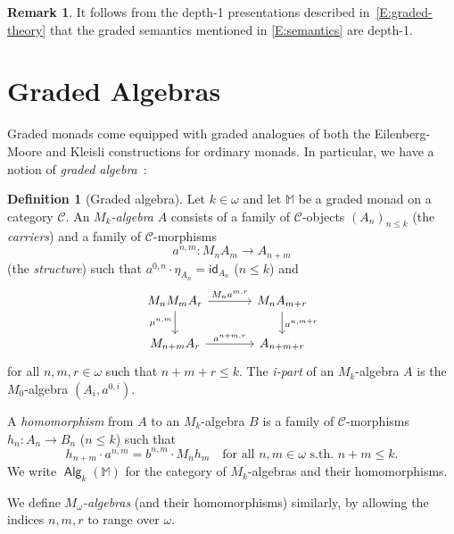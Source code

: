 \documentclass[sigconf,
			final%
			nonacm
                        ]{acmart}
\numberwithin{equation}{section}
\numberwithin{equation}{section}
\theoremstyle{plain}
\theoremstyle{definition}
\newtheorem{defn}[thm]{Definition}
\newtheorem{rem}[thm]{Remark}
\newcommand{\id}{\mathsf{id}}
\newcommand{\M}{\mathbb{M}}                   %
\newcommand{\CatC}{\mathscr{C}}           %
\DeclareMathOperator{\Alg}{\mathsf{Alg}}
\begin{document}
\begin{rem}
  It follows from the depth-1 presentations described
  in~\cref{E:graded-theory} that the graded semantics mentioned in
  \cref{E:semantics} are depth-1.
\end{rem}

\section{Graded Algebras}\label{sec:algebras}
Graded monads come equipped with graded analogues
of both the Eilenberg-Moore and Kleisli constructions for
ordinary monads. In particular, we have a
notion of \emph{graded algebra}~\cite{FKM16, MPS15}:

\begin{defn}[Graded algebra]\label{D:gradedalgebra}
Let $k\in\omega$ and let $\M$ be a graded
monad on a category $\CatC$. An \emph{$M_k$-algebra}
$A$ consists of a family of $\CatC$-objects $(A_n)_{n\leq k}$
(the \emph{carriers}) and a family of $\CatC$-morphisms%
\begin{equation}
  a^{n,m}\colon M_nA_m\to A_{n+m}		\tag{$n+m\le k$}
\end{equation}
(the \emph{structure}) such that $a^{0,n}\cdot\eta_{A_n} = \id_{A_n}$
($n\leq k$) and
\begin{equation}\label{Diagram:gradedalgebralaw}
  \begin{tikzcd}[column sep = 35]
    M_nM_mA_r \arrow[d, "\mu^{n,m}"'] \arrow[r, "M_na^{m,r}"]
    &
    M_nA_{m+r} \arrow[d, "a^{n,m+r}"] \\
    M_{n+m}A_{r} \arrow[r, "a^{n+m,r}"]
    &
    A_{n+m+r}
  \end{tikzcd}
\end{equation}
for all $n,m,r\in\omega$ such that $n+m+r\leq k$. The \emph{i-part} of
an $M_k$-algebra $A$ is the $M_0$-algebra $(A_i, a^{0,i})$.


A \emph{homomorphism} from $A$ to an $M_k$-algebra
$B$ is a family of $\CatC$-morphisms
$h_n\colon A_n\to B_n$ ($n\leq k$) such that
\[
  h_{n+m} \cdot a^{n,m} = b^{n,m}\cdot M_nh_m
  \quad\text{for all $n,m\in\omega$ s.th.~$n+m\le k$.}
\]
  We
write $\Alg_k(\M)$ for the category of $M_k$-algebras
and their homomorphisms.

We define \emph{$M_{\omega}$-algebras} (and their
homomorphisms) similarly, by allowing the indices $n,m,r$
to range over $\omega$.



\end{defn}
\end{document}
